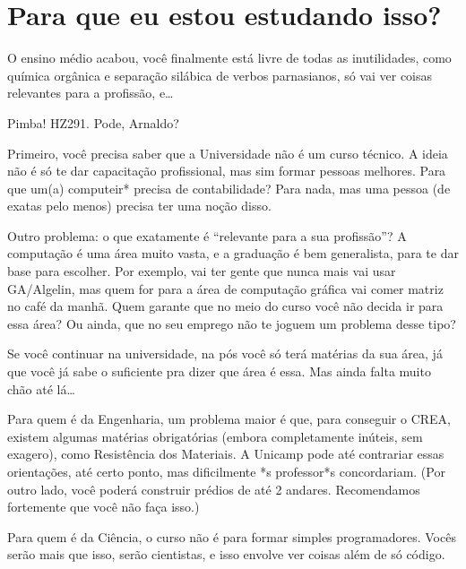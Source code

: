 
\section{Para que eu estou estudando isso?}

O ensino médio acabou, você finalmente está livre de todas as inutilidades, como
química orgânica e separação silábica de verbos parnasianos, só vai ver coisas
relevantes para a profissão, e{\dots}

Pimba! HZ291. Pode, Arnaldo?

Primeiro, você precisa saber que a Universidade não é um curso técnico. A ideia
não é só te dar capacitação profissional, mas sim formar pessoas melhores. Para
que um(a) computeir* precisa de contabilidade? Para nada, mas uma pessoa (de
exatas pelo menos) precisa ter uma noção disso.

Outro problema: o que exatamente é ``relevante para a sua profissão''?  A
computação é uma área muito vasta, e a graduação é bem generalista, para te dar
base para escolher. Por exemplo, vai ter gente que nunca mais vai usar
GA/Algelin, mas quem for para a área de computação gráfica vai comer matriz no
café da manhã. Quem garante que no meio do curso você não decida ir para essa
área? Ou ainda, que no seu emprego não te joguem um problema desse tipo?

Se você continuar na universidade, na pós você só terá matérias da sua área, já
que você já sabe o suficiente pra dizer que área é essa. Mas ainda falta muito
chão até lá{\dots}

Para quem é da Engenharia, um problema maior é que, para conseguir o CREA,
existem algumas matérias obrigatórias (embora completamente inúteis, sem
exagero), como Resistência dos Materiais. A Unicamp pode até contrariar essas
orientações, até certo ponto, mas dificilmente *s professor*s concordariam. (Por
outro lado, você poderá construir prédios de até 2 andares. Recomendamos
fortemente que você não faça isso.)

Para quem é da Ciência, o curso não é para formar simples programadores. Vocês
serão mais que isso, serão cientistas, e isso envolve ver coisas além de só
código.
